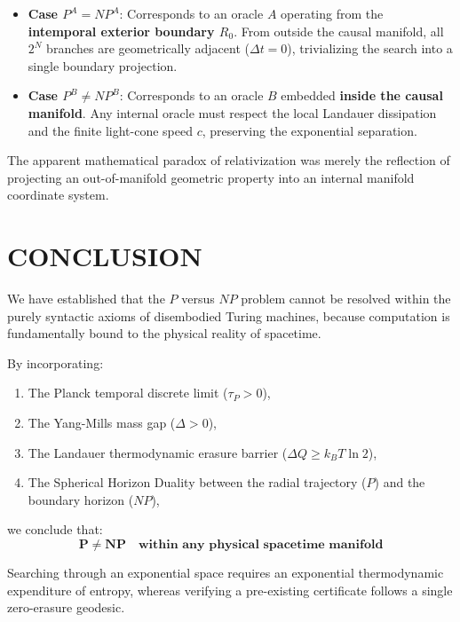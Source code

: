 \documentclass[10pt,twocolumn]{article}
\begin{document}
\begin{itemize}
  \item \textbf{Case $P^A = NP^A$}: Corresponds to an oracle $A$ operating from the \textbf{intemporal exterior boundary $R_0$}. From outside the causal manifold, all $2^N$ branches are geometrically adjacent ($\Delta t = 0$), trivializing the search into a single boundary projection.
  \item \textbf{Case $P^B \neq NP^B$}: Corresponds to an oracle $B$ embedded \textbf{inside the causal manifold}. Any internal oracle must respect the local Landauer dissipation and the finite light-cone speed $c$, preserving the exponential separation.
\end{itemize}

The apparent mathematical paradox of relativization was merely the reflection of projecting an out-of-manifold geometric property into an internal manifold coordinate system.



\section{CONCLUSION}

We have established that the $P$ versus $NP$ problem cannot be resolved within the purely syntactic axioms of disembodied Turing machines, because computation is fundamentally bound to the physical reality of spacetime.

By incorporating:
\begin{enumerate}
  \item The Planck temporal discrete limit ($\tau_P > 0$),
  \item The Yang-Mills mass gap ($\Delta > 0$),
  \item The Landauer thermodynamic erasure barrier ($\Delta Q \ge k_B T \ln 2$),
  \item The Spherical Horizon Duality between the radial trajectory ($P$) and the boundary horizon ($NP$),
\end{enumerate}

we conclude that:
\begin{equation}
  \mathbf{P \neq NP \quad \text{within any physical spacetime manifold}}
\end{equation}

Searching through an exponential space requires an exponential thermodynamic expenditure of entropy, whereas verifying a pre-existing certificate follows a single zero-erasure geodesic. 
\end{document}
